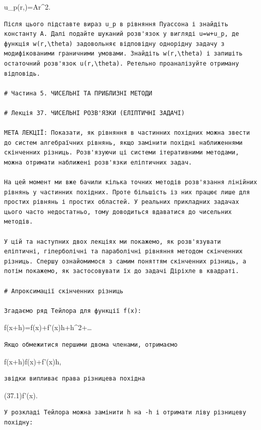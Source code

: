 \documentclass[
  ukrainian,
]{article}
\begin{document}
u\_p(r,\theta)=Ar\^{}2.

\begin{verbatim}
Після цього підставте вираз u_p в рівняння Пуассона і знайдіть константу A. Далі подайте шуканий розв'язок у вигляді u=w+u_p, де функція w(r,\theta) задовольняє відповідну однорідну задачу з модифікованими граничними умовами. Знайдіть w(r,\theta) і запишіть остаточний розв'язок u(r,\theta). Ретельно проаналізуйте отриману відповідь.

# Частина 5. ЧИСЕЛЬНІ ТА ПРИБЛИЗНІ МЕТОДИ

# Лекція 37. ЧИСЕЛЬНІ РОЗВ'ЯЗКИ (ЕЛІПТИЧНІ ЗАДАЧІ)

МЕТА ЛЕКЦІЇ: Показати, як рівняння в частинних похідних можна звести до систем алгебраїчних рівнянь, якщо замінити похідні наближеннями скінченних різниць. Розв'язуючи ці системи ітеративними методами, можна отримати наближені розв'язки еліптичних задач.

На цей момент ми вже бачили кілька точних методів розв'язання лінійних рівнянь у частинних похідних. Проте більшість із них працює лише для простих рівнянь і простих областей. У реальних прикладних задачах цього часто недостатньо, тому доводиться вдаватися до чисельних методів.

У цій та наступних двох лекціях ми покажемо, як розв'язувати еліптичні, гіперболічні та параболічні рівняння методом скінченних різниць. Спершу ознайомимося з самим поняттям скінченних різниць, а потім покажемо, як застосовувати їх до задачі Діріхле в квадраті.

# Апроксимації скінченних різниць

Згадаємо ряд Тейлора для функції f(x):
\end{verbatim}

f(x+h)=f(x)+f'(x)h+h\^{}2+\dots

\begin{verbatim}
Якщо обмежитися першими двома членами, отримаємо
\end{verbatim}

f(x+h)\cong f(x)+f'(x)h,

\begin{verbatim}
звідки випливає права різницева похідна
\end{verbatim}

(37.1)\qquad f'(x)\cong {}.

\begin{verbatim}
У розкладі Тейлора можна замінити h на -h і отримати ліву різницеву похідну:
\end{verbatim}
\end{document}
